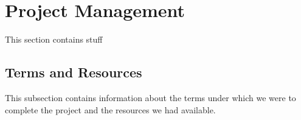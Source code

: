\section{Project Management}
This section contains stuff %

\subsection{Terms and Resources}
This subsection contains information about the terms under which we were to complete the project and the resources we had available.
